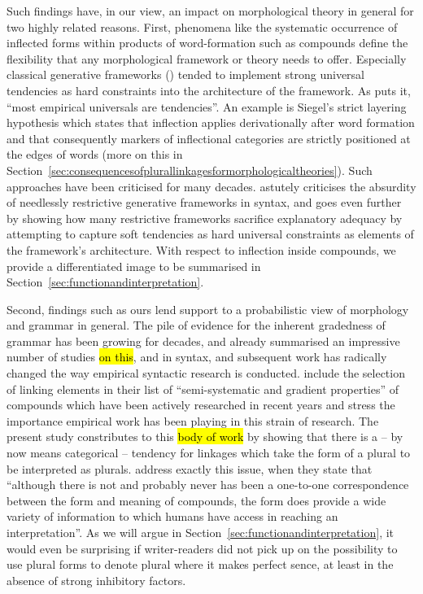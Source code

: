 Such findings have, in our view, an impact on morphological theory in general for two highly related reasons.
First, phenomena like the systematic occurrence of inflected forms within products of word-formation such as compounds define the flexibility that any morphological framework or theory needs to offer.
Especially classical generative frameworks (\egg \citealt{Siegel1979,Mohanan1986,Anderson1992,Pinker1999}) tended to implement strong universal tendencies as hard constraints into the architecture of the framework.
As \textcite[391]{Haspelmath2010} puts it, ``most empirical universals are tendencies''.
An example is Siegel's strict layering hypothesis which states that inflection applies derivationally after word formation and that consequently markers of inflectional categories are strictly positioned at the edges of words (more on this in Section~\ref{sec:consequencesofplurallinkagesformorphologicaltheories}).
Such approaches have been criticised for many decades.
\textcite{Pollard1996} astutely criticises the absurdity of needlessly restrictive generative frameworks in syntax, and \textcite{Haspelmath2010} goes even further by showing how many restrictive frameworks sacrifice explanatory adequacy by attempting to capture soft tendencies as hard universal constraints as elements of the framework's architecture.
With respect to inflection inside compounds, we provide a differentiated image to be summarised in Section~\ref{sec:functionandinterpretation}.

Second, findings such as ours lend support to a probabilistic view of morphology and grammar in general.
The pile of evidence for the inherent gradedness of grammar has been growing for decades, and \textcite{HayBaayen2005} already summarised an impressive number of studies \hl{on this}, and in syntax, \textcite{Bresnan2007} and subsequent work has radically changed the way empirical syntactic research is conducted.
\textcite[105]{ArndtlappeEa2016} include the selection of linking elements in their list of ``semi-systematic and gradient properties'' of compounds which have been actively researched in recent years and stress the importance empirical work has been playing in this strain of research.
The present study constributes to this \hl{body of work} by showing that there is a -- by now means categorical -- tendency for linkages which take the form of a plural to be interpreted as plurals.
\textcite[107]{ArndtlappeEa2016} address exactly this issue, when they state that ``although there is not and probably never has been a one-to-one correspondence between the form and meaning of compounds, the form does provide a wide variety of information to which humans have access in reaching an interpretation''.
As we will argue in Section~\ref{sec:functionandinterpretation}, it would even be surprising if writer-readers did not pick up on the possibility to use plural forms to denote plural where it makes perfect sence, at least in the absence of strong inhibitory factors.

